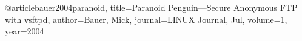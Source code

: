 @article{bauer2004paranoid,
  title={Paranoid Penguin—Secure Anonymous FTP with vsftpd},
  author={Bauer, Mick},
  journal={LINUX{\textregistered} Journal, Jul},
  volume={1},
  year={2004}
}